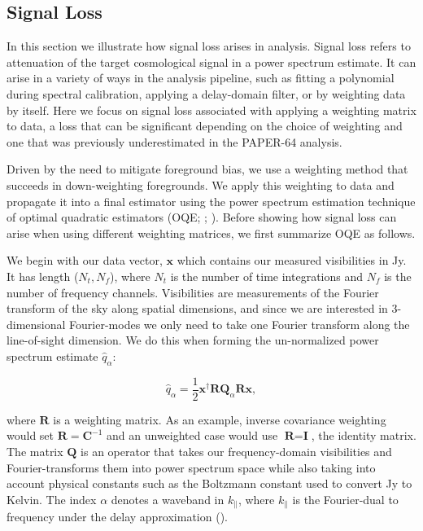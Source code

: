 \documentclass[preprint2,numberedappendix,tighten]{aastex6}  %
\begin{document}
\subsection{Signal Loss}
\label{sec:SiglossOverview}

In this section we illustrate how signal loss arises in analysis. Signal loss refers to attenuation of the target cosmological signal in a power spectrum estimate. It can arise in a variety of ways in the analysis pipeline, such as fitting a polynomial during spectral calibration, applying a delay-domain filter, or by weighting data by itself. Here we focus on signal loss associated with applying a weighting matrix to data, a loss that can be significant depending on the choice of weighting and one that was previously underestimated in the PAPER-64 analysis.

Driven by the need to mitigate foreground bias, we use a weighting method that succeeds in down-weighting foregrounds. We apply this weighting to data and propagate it into a final estimator using the power spectrum estimation technique of optimal quadratic estimators (OQE; \citealt{liu_tegmark2011}; \citealt{liu_et_al2014b}). Before showing how signal loss can arise when using different weighting matrices, we first summarize OQE as follows.

We begin with our data vector, $\textbf{x}$ which contains our measured visibilities in Jy. It has length ($N_{t}, N_{f}$), where $N_{t}$ is the number of time integrations and $N_{f}$ is the number of frequency channels. Visibilities are measurements of the Fourier transform of the sky along spatial dimensions, and since we are interested in $3$-dimensional Fourier-modes we only need to take one Fourier transform along the line-of-sight dimension. We do this when forming the un-normalized power spectrum estimate $\hat{q}_{\alpha}$:

\begin{equation}
\label{eq:qhat}
\hat{q}_{\alpha} = \frac{1}{2}\textbf{x}^{\dagger}\textbf{R}\textbf{Q}_{\alpha}\textbf{R}\textbf{x},
\end{equation}

\noindent where $\textbf{R}$ is a weighting matrix. As an example, inverse covariance weighting would set $\textbf{R} = \textbf{C}^{-1}$ and an unweighted case would use $\textbf{R} = \textbf{I}$, the identity matrix. The matrix $\textbf{Q}$ is an operator that takes our frequency-domain visibilities and Fourier-transforms them into power spectrum space while also taking into account physical constants such as the Boltzmann constant used to convert Jy to Kelvin. The index $\alpha$ denotes a waveband in $k_{\parallel}$, where $k_{\parallel}$ is the Fourier-dual to frequency under the delay approximation (\citealt{parsons_et_al2012b}).
\end{document}
